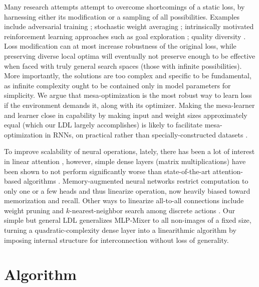 \documentclass{article}
\begin{document}
Many research attempts attempt to overcome shortcomings of a static loss, by harnessing either its modification or a sampling of all possibilities. Examples include adversarial training \cite{du2021understanding} \cite{goodfellow2015explaining}; stochastic weight averaging \cite{izmailov2019averaging}; intrinsically motivated reinforcement learning approaches \cite{6294131} such as goal exploration \cite{DBLP:journals/corr/abs-1708-02190}; quality diversity \cite{Gravina_2019} \cite{meyerson2017discovering} \cite{parkerholder2020effective}. Loss modification can at most increase robustness of the original loss, while preserving diverse local optima will eventually not preserve enough to be effective when faced with truly general search spaces (those with infinite possibilities). More importantly, the solutions are too complex and specific to be fundamental, as infinite complexity ought to be contained only in model parameters for simplicity. We argue that mesa-optimization \cite{hubinger2019risks} is the most robust way to learn loss if the environment demands it, along with its optimizer. Making the mesa-learner and learner close in capability by making input and weight sizes approximately equal (which our LDL largely accomplishes) is likely to facilitate mesa-optimization in RNNs, on practical rather than specially-constructed datasets \cite{Ravi2017OptimizationAA}.

To improve scalability of neural operations, lately, there has been a lot of interest in linear attention \cite{schlag2021linear}, however, simple dense layers (matrix multiplications) have been shown to not perform significantly worse than state-of-the-art attention-based algorithms \cite{tolstikhin2021mlpmixer}. Memory-augmented neural networks \cite{collier2019memoryaugmented} restrict computation to only one or a few heads and thus linearize operation, now heavily biased toward memorization and recall. Other ways to linearize all-to-all connections include weight pruning \cite{zhou2021effective} and $k$-nearest-neighbor search among discrete actions \cite{DBLP:journals/corr/Dulac-ArnoldESC15}. Our simple but general LDL generalizes MLP-Mixer \cite{tolstikhin2021mlpmixer} to all non-images of a fixed size, turning a quadratic-complexity dense layer into a linearithmic algorithm by imposing internal structure for interconnection without loss of generality.

\section{Algorithm}
\end{document}

